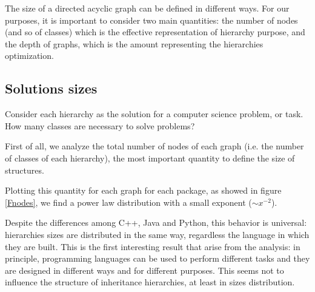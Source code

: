 The size of a directed acyclic graph can be defined in different ways. For our purposes, it is important to consider two main quantities: the number of nodes (and so of classes) which is the effective representation of hierarchy purpose, and the depth of graphs, which is the amount representing the hierarchies optimization.

\subsection{Solutions sizes}
Consider each hierarchy as the solution for a computer science problem, or task. How many classes are necessary to solve problems?

First of all, we analyze the total number of nodes of each graph (i.e. the number of classes of each hierarchy), the most important quantity to define the size of structures.

Plotting this quantity for each graph for each package, as showed in figure \ref{Fnodes}, we find a power law distribution with a small exponent ($\sim x^{-2}$).

Despite the differences among C++, Java and Python, this behavior is universal: hierarchies sizes are distributed in the same way, regardless the language in which they are built. This is the first interesting result that arise from the analysis: in principle, programming languages can be used to perform different tasks and they are designed in different ways and for different purposes. This seems not to influence the structure of inheritance hierarchies, at least in sizes distribution.

